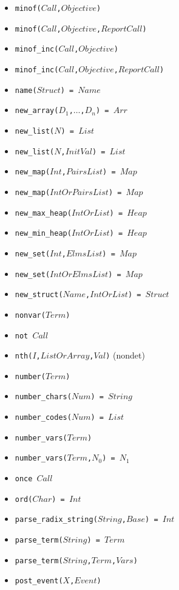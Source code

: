 \documentclass[10pt]{article}
\begin{document}
\begin{multicols}{2}
\begin{scriptsize}
\begin{itemize}
    \item \texttt{minof($Call$,$Objective$)} 
    \item \texttt{minof($Call$,$Objective$,$ReportCall$)} 
    \item \texttt{minof\_inc($Call$,$Objective$)} 
    \item \texttt{minof\_inc($Call$,$Objective$,$ReportCall$)} 
    \item \texttt{name($Struct$) = $Name$} 
    \item \texttt{new\_array($D_1$,$\ldots$,$D_n$) = $Arr$} 
    \item \texttt{new\_list($N$) = $List$} 
    \item \texttt{new\_list($N$,$InitVal$) = $List$} 
    \item \texttt{new\_map($Int$,$PairsList$) = $Map$} 
    \item \texttt{new\_map($IntOrPairsList$) = $Map$} 
    \item \texttt{new\_max\_heap($IntOrList$) = $Heap$}
    \item \texttt{new\_min\_heap($IntOrList$) = $Heap$}
    \item \texttt{new\_set($Int$,$ElmsList$) = $Map$} 
    \item \texttt{new\_set($IntOrElmsList$) = $Map$} 
    \item \texttt{new\_struct($Name$,$IntOrList$) = $Struct$} 
    \item \texttt{nonvar($Term$)} 
    \item \texttt{not $Call$}
    \item \texttt{nth($I$,$ListOrArray$,$Val$)} (nondet)
    \item \texttt{number($Term$)} 
    \item \texttt{number\_chars($Num$) = $String$} 
    \item \texttt{number\_codes($Num$) = $List$} 
    \item \texttt{number\_vars($Term$)}
    \item \texttt{number\_vars($Term$,$N_0$) = $N_1$}
    \item \texttt{once $Call$}
    \item \texttt{ord($Char$) = $Int$} 
    \item \texttt{parse\_radix\_string($String$,$Base$) = $Int$}
    \item \texttt{parse\_term($String$) = $Term$}
    \item \texttt{parse\_term($String$,$Term$,$Vars$)}
    \item \texttt{post\_event($X$,$Event$)}

\end{itemize}
\end{scriptsize}
\end{multicols}
\end{document}
